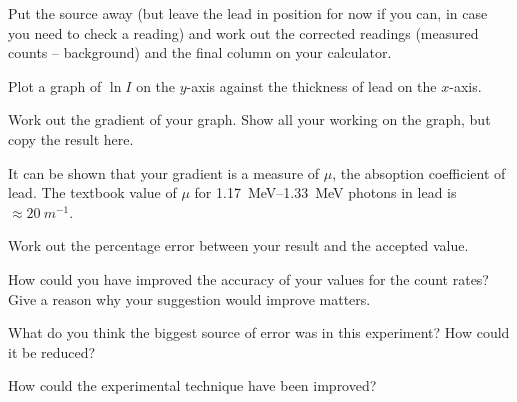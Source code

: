 \begin{questions}
\question Put the source away (but leave the lead in position for now if you can, in case you need to check a reading) and work out the corrected readings (measured counts -- background) and the final column on your calculator.

\question Plot a graph of $\ln I$ on the $y$-axis against the thickness of lead on the $x$-axis.

\question Work out the gradient of your graph.  Show all your working on the graph, but copy the result here. \answerline

It can be shown that your gradient is a measure of $\mu$, the absoption coefficient of lead.  The textbook value of $\mu$ for \SI{1.17}{MeV}--\SI{1.33}{MeV} photons in lead is $\approx\SI{20}{m^{-1}}$.

\question Work out the percentage error between your result and the accepted value.\fillwithlines{2cm}

\question How could you have improved the accuracy of your values for the count rates?  Give a reason why your suggestion would improve matters.  \fillwithlines{3cm}

\question What do you think the biggest source of error was in this experiment?  How could it be reduced? \fillwithlines{2cm}

\question How could the experimental technique have been improved? \fillwithlines{2cm}

\end{questions}
